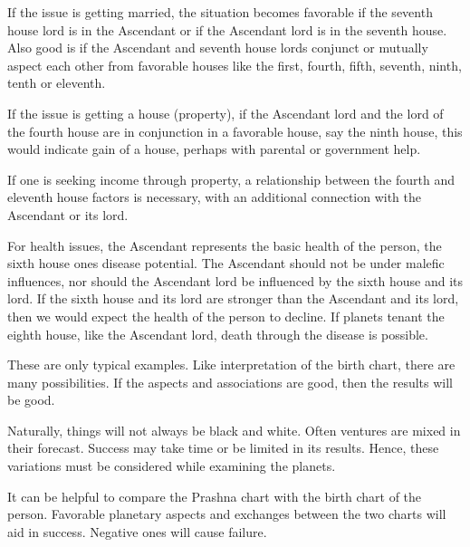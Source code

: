  

If the issue is getting married, the situation becomes favorable if the seventh house lord is in the Ascendant or if the Ascendant lord is in the seventh house. Also good is if the Ascendant and seventh house lords conjunct or mutually aspect each other from favorable houses like the first, fourth, fifth, seventh, ninth, tenth or eleventh.

 

If the issue is getting a house (property), if the Ascendant lord and the lord of the fourth house are in conjunction in a favorable house, say the ninth house, this would indicate gain of a house, perhaps with parental or government help.

 

If one is seeking income through property, a relationship between the fourth and eleventh house factors is necessary, with an additional connection with the Ascendant or its lord.

 

For health issues, the Ascendant represents the basic health of the person, the sixth house ones disease potential. The Ascendant should not be under malefic influences, nor should the Ascendant lord be influenced by the sixth house and its lord. If the sixth house and its lord are stronger than the Ascendant and its lord, then we would expect the health of the person to decline. If planets tenant the eighth house, like the Ascendant lord, death through the disease is possible.

 

These are only typical examples. Like interpretation of the birth chart, there are many possibilities. If the aspects and associations are good, then the results will be good.

 

Naturally, things will not always be black and white. Often ventures are mixed in their forecast. Success may take time or be limited in its results. Hence, these variations must be considered while examining the planets.

 


It can be helpful to compare the Prashna chart with the birth chart of the person. Favorable planetary aspects and exchanges between the two charts will aid in success. Negative ones will cause failure.

 

 

